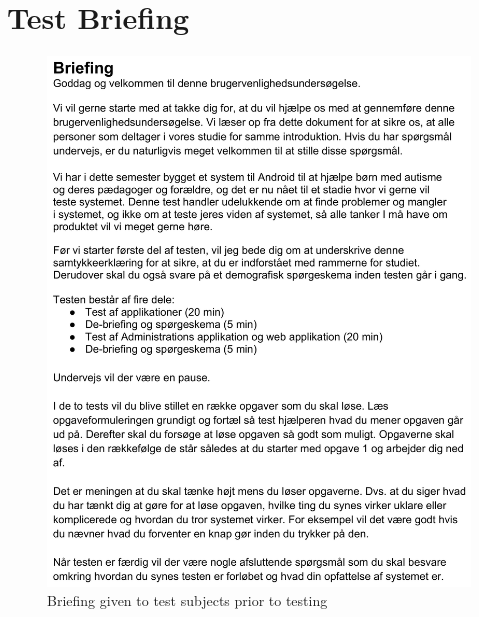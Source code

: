 \section{Test Briefing}
\begin{figure}[h!]
	\centering
	\includegraphics[scale=0.8]{gfx/usability-briefing.png}
	\caption{Briefing given to test subjects prior to testing}
	\label{fig:usability_briefing}
\end{figure}

